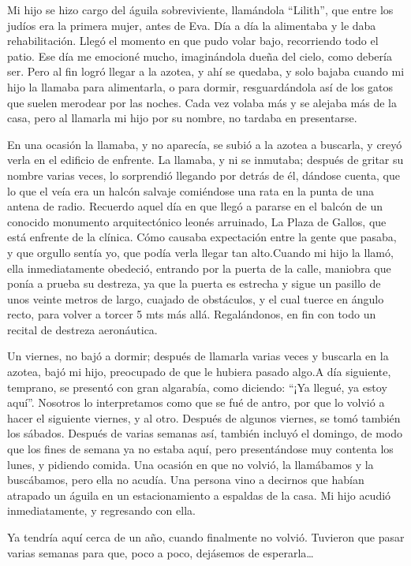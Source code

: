 \documentclass[letterpaper, 12pt]{book}
\begin{document}
Mi hijo se hizo cargo del águila sobreviviente, llamándola ``Lilith'', que entre los judíos era la primera mujer, antes de Eva. Día a día la alimentaba y le daba rehabilitación. Llegó el momento en que pudo volar bajo, recorriendo todo el patio. Ese día me emocioné mucho, imaginándola dueña del cielo, como debería ser. Pero al fin logró llegar a la azotea, y ahí se quedaba, y solo bajaba cuando mi hijo la llamaba para alimentarla, o para dormir, resguardándola así de los gatos que suelen merodear por las noches. Cada vez volaba más y se alejaba más de la casa, pero al llamarla mi hijo por su nombre, no tardaba en presentarse.

En una ocasión la llamaba, y no aparecía, se subió a la azotea a buscarla, y creyó verla en el edificio de enfrente. La llamaba, y ni se inmutaba; después de gritar su nombre varias veces, lo sorprendió llegando por detrás de él, dándose cuenta, que lo que el veía era un halcón salvaje comiéndose una rata en la punta de una antena de radio. Recuerdo aquel día en que llegó a pararse en el balcón de un conocido monumento arquitectónico leonés arruinado, La Plaza de Gallos, que está enfrente de la clínica. Cómo causaba expectación entre la gente que pasaba, y que orgullo sentía yo, que podía verla llegar tan alto.Cuando mi hijo la llamó, ella inmediatamente obedeció, entrando por la puerta de la calle, maniobra que ponía a prueba su destreza, ya que la puerta es estrecha y sigue un pasillo de unos veinte metros de largo, cuajado de obstáculos, y el cual tuerce en ángulo recto, para volver a torcer 5 mts más allá. Regalándonos, en fin con todo un recital de destreza aeronáutica.


Un viernes, no bajó a dormir; después de llamarla varias veces y buscarla en la azotea, bajó mi hijo, preocupado de que le hubiera pasado algo.A día siguiente, temprano, se presentó con gran algarabía, como diciendo: ``¡Ya llegué, ya estoy aquí''. Nosotros lo interpretamos como que se fué de antro, por que lo volvió a hacer el siguiente viernes, y al otro. Después de algunos viernes, se tomó también los sábados. Después de varias semanas así, también incluyó el domingo, de modo que los fines de semana ya no estaba aquí, pero presentándose muy contenta los lunes, y pidiendo comida. Una ocasión en que no volvió, la llamábamos y  la buscábamos, pero ella no acudía. Una persona vino a decirnos que habían atrapado un águila en un estacionamiento a espaldas de la casa. Mi hijo acudió inmediatamente, y regresando con ella. 


Ya tendría aquí cerca de un año, cuando finalmente no volvió. Tuvieron que pasar varias semanas para que, poco a poco, dejásemos de esperarla\ldots
\end{document}
